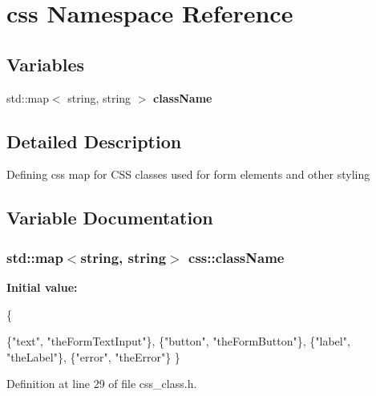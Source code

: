 \hypertarget{namespacecss}{\section{css Namespace Reference}
\label{namespacecss}
}
\subsection*{Variables}
\begin{DoxyCompactItemize}
\item 
std\-::map$<$ string, string $>$ {\bfseries class\-Name}
\end{DoxyCompactItemize}


\subsection{Detailed Description}
Defining css map for C\-S\-S classes used for form elements and other styling 

\subsection{Variable Documentation}
\hypertarget{namespacecss_a1e5220db98ed82185dd298898f7b2f63}{
\subsubsection[{class\-Name}]{\setlength{\rightskip}{0pt plus 5cm}std\-::map$<$string, string$>$ css\-::class\-Name}}\label{namespacecss_a1e5220db98ed82185dd298898f7b2f63}
{\bfseries Initial value\-:}
\begin{DoxyCode}
 
    \{

        

        \{\textcolor{stringliteral}{"text"}, \textcolor{stringliteral}{"theFormTextInput"}\},
        \{\textcolor{stringliteral}{"button"}, \textcolor{stringliteral}{"theFormButton"}\},
        \{\textcolor{stringliteral}{"label"}, \textcolor{stringliteral}{"theLabel"}\},
        \{\textcolor{stringliteral}{"error"}, \textcolor{stringliteral}{"theError"}\}
    \}
\end{DoxyCode}


Definition at line 29 of file css\-\_\-class.\-h.

